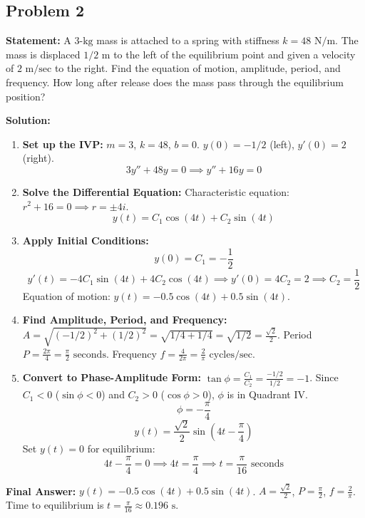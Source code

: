 \documentclass[11pt]{article}
\begin{document}
\subsection{Problem 2}
\textbf{Statement:} A $3\text{-kg}$ mass is attached to a spring with stiffness $k = 48 \text{ N/m}$. The mass is displaced $1/2 \text{ m}$ to the left of the equilibrium point and given a velocity of $2 \text{ m/sec}$ to the right. Find the equation of motion, amplitude, period, and frequency. How long after release does the mass pass through the equilibrium position?

\textbf{Solution:}
\begin{enumerate}
    \item \textbf{Set up the IVP:}
    $m = 3$, $k = 48$, $b = 0$. $y(0) = -1/2$ (left), $y'(0) = 2$ (right).
    \[ 3y'' + 48y = 0 \implies y'' + 16y = 0 \]
    
    \item \textbf{Solve the Differential Equation:}
    Characteristic equation: $r^2 + 16 = 0 \implies r = \pm 4i$.
    \[ y(t) = C_1 \cos(4t) + C_2 \sin(4t) \]
    
    \item \textbf{Apply Initial Conditions:}
    \[ y(0) = C_1 = -\frac{1}{2} \]
    \[ y'(t) = -4C_1 \sin(4t) + 4C_2 \cos(4t) \implies y'(0) = 4C_2 = 2 \implies C_2 = \frac{1}{2} \]
    Equation of motion: $y(t) = -0.5 \cos(4t) + 0.5 \sin(4t)$.
    
    \item \textbf{Find Amplitude, Period, and Frequency:}
    $A = \sqrt{(-1/2)^2 + (1/2)^2} = \sqrt{1/4 + 1/4} = \sqrt{1/2} = \frac{\sqrt{2}}{2}$.
    Period $P = \frac{2\pi}{4} = \frac{\pi}{2} \text{ seconds}$.
    Frequency $f = \frac{4}{2\pi} = \frac{2}{\pi} \text{ cycles/sec}$.
    
    \item \textbf{Convert to Phase-Amplitude Form:}
    $\tan \phi = \frac{C_1}{C_2} = \frac{-1/2}{1/2} = -1$.
    Since $C_1 < 0$ ($\sin \phi < 0$) and $C_2 > 0$ ($\cos \phi > 0$), $\phi$ is in Quadrant IV.
    \[ \phi = -\frac{\pi}{4} \]
    \[ y(t) = \frac{\sqrt{2}}{2} \sin\left(4t - \frac{\pi}{4}\right) \]
    Set $y(t) = 0$ for equilibrium:
    \[ 4t - \frac{\pi}{4} = 0 \implies 4t = \frac{\pi}{4} \implies t = \frac{\pi}{16} \text{ seconds} \]
\end{enumerate}
\textbf{Final Answer:} $y(t) = -0.5 \cos(4t) + 0.5 \sin(4t)$. $A = \frac{\sqrt{2}}{2}$, $P = \frac{\pi}{2}$, $f = \frac{2}{\pi}$. Time to equilibrium is $t = \frac{\pi}{16} \approx 0.196 \text{ s}$.
\end{document}
